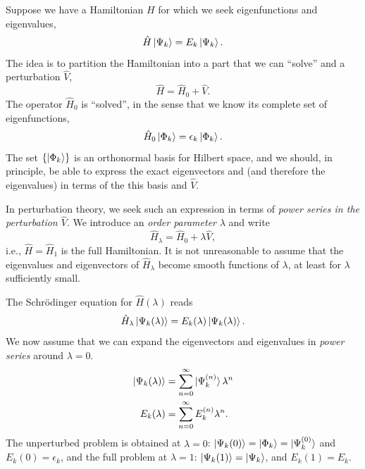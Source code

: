 \documentclass{report}
\theoremstyle{plain}
\theoremstyle{definition}
\begin{document}
Suppose we have a Hamiltonian $H$ for which we seek eigenfunctions and
eigenvalues,
\begin{equation}
  \hat{H} \ket{\Psi_k} = E_k \ket{\Psi_k}.
\end{equation}
The idea is to partition the Hamiltonian into a
part that we can ``solve'' and a perturbation $\hat{V}$,
\begin{equation}
  \hat{H} = \hat{H}_0 + \hat{V}.
\end{equation}
The operator $\hat{H}_0$ is ``solved'', in the sense that we know its
complete set of eigenfunctions,
\begin{equation}
  \hat{H}_0 \ket{\Phi_k} = \epsilon_k \ket{\Phi_k}. \label{eq:se-unpert}
\end{equation}
The set $\{\ket{\Phi_k}\}$ is an orthonormal basis for Hilbert space,
and we should, in principle, be able to express the exact eigenvectors
and (and therefore the eigenvalues) in terms of the this basis and
$\hat{V}$.

In perturbation theory, we seek such an expression in terms of
\emph{power series in the perturbation $\hat{V}$}. We introduce an
\emph{order parameter} $\lambda$ and write
\begin{equation}
  \hat{H}_\lambda = \hat{H}_0 + \lambda \hat{V},
\end{equation}
i.e., $\hat{H} = \hat{H}_1$ is the full Hamiltonian. It is not
unreasonable to assume that the eigenvalues and eigenvectors of
$\hat{H}_\lambda$ become smooth functions of $\lambda$, at least for
$\lambda$ sufficiently small.

The Schr\"odinger equation for $\hat{H}(\lambda)$ reads
\begin{equation}
  \hat{H}_\lambda \ket{\Psi_k (\lambda)} = E_k(\lambda)
  \ket{\Psi_k(\lambda)}.
\end{equation}
We now assume that we can expand the
eigenvectors and eigenvalues in \emph{power series} around $\lambda =
0$.
\begin{subequations}
  \label{eq:rspt-exps}
  \begin{align}
    \ket{\Psi_k(\lambda)} &= \sum_{n=0}^\infty
    \ket{\Psi_k^{(n)}} \lambda^n \label{eq:rspt-psi} \\
    E_k(\lambda) &= \sum_{n=0}^\infty
    E_k^{(n)} \lambda^n.\label{eq:rspt-e}
  \end{align}
\end{subequations}
The unperturbed problem is obtained at $\lambda=0$: $\ket{\Psi_k(0)} =
\ket{\Phi_k} = \ket{\Psi_k^{(0)}}$ and $E_k(0) = \epsilon_k$, and the full problem at
$\lambda=1$: $\ket{\Psi_k(1)} = \ket{\Psi_k}$, and $E_k(1) = E_k$.
\end{document}
